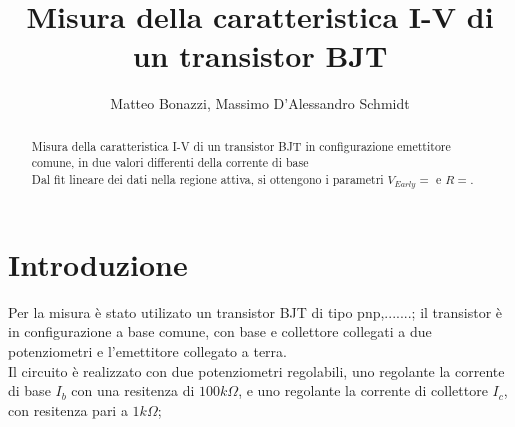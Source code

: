 \documentclass{article}
\title{Misura della caratteristica I-V di un transistor BJT}
\author{Matteo Bonazzi, Massimo D'Alessandro Schmidt}
\begin{document}
\maketitle
\begin{abstract}
    Misura della caratteristica I-V di un transistor BJT in configurazione emettitore comune, in due valori differenti della corrente di base \\
    Dal fit lineare dei dati nella regione attiva, si ottengono i parametri $V_{Early}=$ e $R=$.
\end{abstract}

\section{Introduzione}
Per la misura è stato utilizato un transistor BJT di tipo pnp,.......; il transistor è in configurazione a base comune, con base
e collettore collegati a due potenziometri e l'emettitore collegato a terra.\\
Il circuito è realizzato con due potenziometri regolabili, uno regolante la corrente di base $I_b$ con una resitenza di $100k\Omega$, e uno regolante
la corrente di collettore $I_c$, con resitenza pari a $1k\Omega$;
\end{document}
